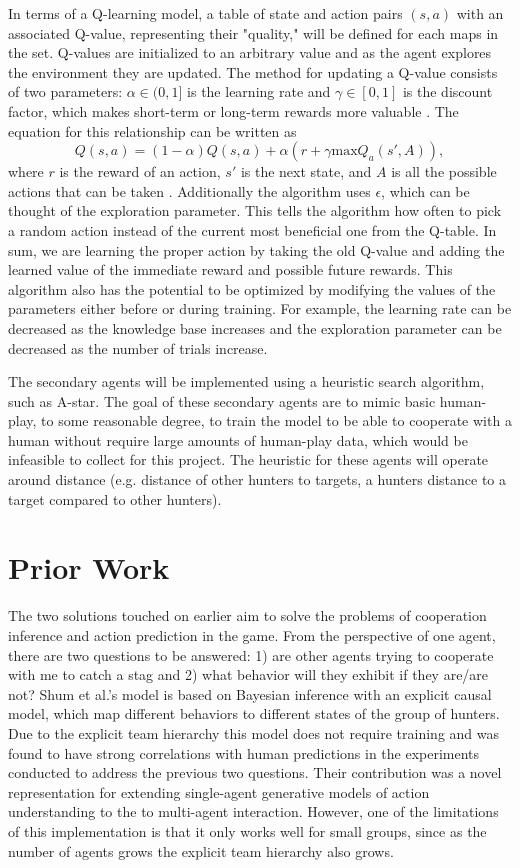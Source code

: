 \documentclass[10pt,twocolumn]{article}
\begin{document}
In terms of a Q-learning model, a table of state and action pairs $(s, a)$ with an associated Q-value, representing their "quality," will be defined for each maps in the set.
Q-values are initialized to an arbitrary value and as the agent explores the environment they are updated.
The method for updating a Q-value consists of two parameters: $\alpha \in (0, 1]$ is the learning rate and $\gamma \in [0, 1]$ is the discount factor, which makes short-term or long-term rewards more valuable \cite{Kaelbling1996}.
The equation for this relationship can be written as \[ Q(s, a) = (1 - \alpha)Q(s, a) + \alpha(r + \gamma \text{max}Q_a(s', A)),\] where $r$ is the reward of an action, $s'$ is the next state, and $A$ is all the possible actions that can be taken \cite{}.
Additionally the algorithm uses $\epsilon$, which can be thought of the exploration parameter.
This tells the algorithm how often to pick a random action instead of the current most beneficial one from the Q-table.
In sum, we are learning the proper action by taking the old Q-value and adding the learned value of the immediate reward and possible future rewards.
This algorithm also has the potential to be optimized by modifying the values of the parameters either before or during training.
For example, the learning rate can be decreased as the knowledge base increases and the exploration parameter can be decreased as the number of trials increase.

The secondary agents will be implemented using a heuristic search algorithm, such as A-star.
The goal of these secondary agents are to mimic basic human-play, to some reasonable degree, to train the model to be able to cooperate with a human without require large amounts of human-play data, which would be infeasible to collect for this project.
The heuristic for these agents will operate around distance (e.g. distance of other hunters to targets, a hunters distance to a target compared to other hunters).

\section{Prior Work}

The two solutions touched on earlier aim to solve the problems of cooperation inference and action prediction in the game.
From the perspective of one agent, there are two questions to be answered: 1) are other agents trying to cooperate with me to catch a stag and 2) what behavior will they exhibit if they are/are not?
Shum et al.'s model is based on Bayesian inference with an explicit causal model, which map different behaviors to different states of the group of hunters.
Due to the explicit team hierarchy this model does not require training and was found to have strong correlations with human predictions in the experiments conducted to address the previous two questions.
Their contribution was a novel representation for extending single-agent generative models of action understanding to the to multi-agent interaction.
However, one of the limitations of this implementation is that it only works well for small groups, since as the number of agents grows the explicit team hierarchy also grows.
\end{document}
